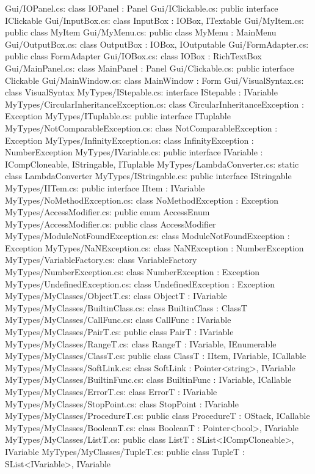 Gui/IOPanel.cs:	class IOPanel : Panel 
Gui/IClickable.cs:	public interface IClickable 
Gui/InputBox.cs:	class InputBox : IOBox, ITextable 
Gui/MyItem.cs:	public class MyItem 
Gui/MyMenu.cs:	public class MyMenu : MainMenu 
Gui/OutputBox.cs:	class OutputBox : IOBox, IOutputable 
Gui/FormAdapter.cs:	public class FormAdapter 
Gui/IOBox.cs:	class IOBox : RichTextBox 
Gui/MainPanel.cs:	class MainPanel : Panel 
Gui/Clickable.cs:	public interface Clickable 
Gui/MainWindow.cs:	class MainWindow : Form 
Gui/VisualSyntax.cs:	class VisualSyntax 
MyTypes/IStepable.cs:	interface IStepable : IVariable 
MyTypes/CircularInheritanceException.cs:	class CircularInheritanceException : Exception 
MyTypes/ITuplable.cs:	public interface ITuplable 
MyTypes/NotComparableException.cs:	class NotComparableException : Exception 
MyTypes/InfinityException.cs:	class InfinityException : NumberException 
MyTypes/IVariable.cs:	public interface IVariable : ICompCloneable, IStringable, ITuplable 
MyTypes/LambdaConverter.cs:	static class LambdaConverter 
MyTypes/IStringable.cs:	public interface IStringable 
MyTypes/IITem.cs:	public interface IItem : IVariable 
MyTypes/NoMethodException.cs:	class NoMethodException : Exception 
MyTypes/AccessModifier.cs:	public enum AccessEnum 
MyTypes/AccessModifier.cs:	public class AccessModifier 
MyTypes/ModuleNotFoundException.cs:	class ModuleNotFoundException : Exception 
MyTypes/NaNException.cs:	class NaNException : NumberException 
MyTypes/VariableFactory.cs:	class VariableFactory 
MyTypes/NumberException.cs:	class NumberException : Exception 
MyTypes/UndefinedException.cs:	class UndefinedException : Exception 
MyTypes/MyClasses/ObjectT.cs:	class ObjectT : IVariable 
MyTypes/MyClasses/BuiltinClass.cs:	class BuiltinClass : ClassT 
MyTypes/MyClasses/CallFunc.cs:	class CallFunc : IVariable 
MyTypes/MyClasses/PairT.cs:	public class PairT : IVariable 
MyTypes/MyClasses/RangeT.cs:	class RangeT : IVariable, IEnumerable 
MyTypes/MyClasses/ClassT.cs:	public class ClassT : IItem, IVariable, ICallable 
MyTypes/MyClasses/SoftLink.cs:	class SoftLink : Pointer<string>, IVariable 
MyTypes/MyClasses/BuiltinFunc.cs:	class BuiltinFunc : IVariable, ICallable  
MyTypes/MyClasses/ErrorT.cs:	class ErrorT : IVariable 
MyTypes/MyClasses/StopPoint.cs:	class StopPoint : IVariable 
MyTypes/MyClasses/ProcedureT.cs:	public class ProcedureT : OStack, ICallable  
MyTypes/MyClasses/BooleanT.cs:	class BooleanT : Pointer<bool>, IVariable 
MyTypes/MyClasses/ListT.cs:	public class ListT : SList<ICompCloneable>, IVariable 
MyTypes/MyClasses/TupleT.cs:	public class TupleT : SList<IVariable>, IVariable 
